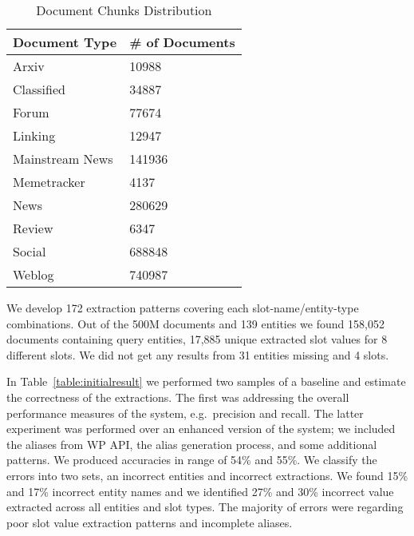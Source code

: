 \begin{table}
\caption{Document Chunks Distribution }
\centering
\label{table:documentsDist}

\begin{tabular}{|p{3.8cm}|p{3cm}|}
\hline 
\textbf{Document Type} & \textbf{\# of Documents}\\ 
\hline 
Arxiv & 10988  \\ \hline
 Classified & 34887  \\ \hline
 Forum & 77674  \\ \hline
 Linking & 12947  \\ \hline
 Mainstream News & 141936  \\ \hline
 Memetracker & 4137  \\ \hline
 News & 280629  \\ \hline
 Review & 6347 \\ \hline
 Social & 688848 \\ \hline
 Weblog & 740987  \\ \hline
\end{tabular} 
\end{table}


 
 
 
We develop 172 extraction patterns covering each slot-name/entity-type combinations.
Out of the 500M documents and 139 entities we found 158,052 documents containing query entities, 17,885 unique extracted slot values for 8 different slots.
We did not get any results from 31 entities missing and 4 slots.

In Table~\ref{table:initialresult} we performed two samples of a baseline and estimate the correctness of the extractions.
The first was addressing the overall performance measures of the system, e.g.\ precision and recall.
The latter experiment was performed over an enhanced version of the system; we included the aliases from WP API, the alias generation process, and some additional patterns. 
We produced accuracies in range of  54\% and 55\%.
We classify the errors into two sets, an incorrect entities and incorrect extractions.
We found 15\% and 17\% incorrect entity names and we identified 27\% and 30\% incorrect value extracted across all entities and slot types.
The majority of errors were regarding poor slot value extraction patterns and incomplete aliases.

